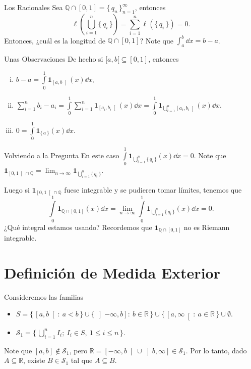 \documentclass[utf8]{beamer}
\theoremstyle{plain}
\theoremstyle{definition}
\theoremstyle{remark}
\numberwithin{equation}{section}
\newcommand{\bQ}{\mathbb{Q}}    %
\newcommand{\bR}{\mathbb{R}}    %
\newcommand{\cS}{\mathcal{S}}           %
\newcommand{\bonj}[1]{\left\lbrack#1\right\rbrack}
\newcommand{\rbonj}[1]{\left\rbrack#1\right\rbrack}
\newcommand{\lbonj}[1]{\left\lbrack#1\right\lbrack}
\newcommand{\set}[1]{\{\,#1\,\}}    %
\newcommand{\Set}[1]{\biggl\{\,#1\,\biggr\}} %
\renewcommand{\l}{\ell}                   %
\renewcommand{\leq}{\leqslant}          %
\newcommand{\ind}{\mathbf{1}}       %
\newcommand{\sucn}{_{n=1}^\infty} %
\renewcommand{\.}{\Cdot}                %
\begin{document}
\begin{frame}{Los Racionales}
  Sea $\bQ\cap[0,1]=\set{q_n}\sucn$, entonces
  $$\l\left(\bigcup_{i=1}^n\set{q_i}\right)=\sum_{i=1}^n\l(\set{q_i})=0.$$
  Entonces, ¿cuál es la longitud de $\bQ\cap[0,1]$? Note que $\displaystyle\int_a^b\dd x=b-a$. 
\end{frame}

\begin{frame}{Unas Observaciones}
  De hecho si $[a,b[\subseteq[0,1]$, entonces
  \begin{enumerate}[(i)]
    \item $\displaystyle b-a=\int\limits_0^1\ind_{\lbonj{a,b}}(x)\dd x$.
    \item $\displaystyle \sum_{i=1}^nb_i-a_i=\int\limits_0^1\sum_{i=1}^n\ind_{\lbonj{a_i,b_i}}(x)\dd x=\int\limits_0^1\ind_{\bigcup_{i=1}^n\lbonj{a_i,b_i}}(x)\dd x$.
    \item $\displaystyle 0=\int\limits_0^1\ind_{\set{a}}(x)\dd x$.
  \end{enumerate}
\end{frame}

\begin{frame}{Volviendo a la Pregunta}
  En este caso $\displaystyle\int\limits_0^1\ind_{\bigcup_{i=1}^n\set{q_i}}(x)\dd x=0$. Note que $\ind_{\lbonj{0,1}\cap\bQ}=\lim_{n\to\infty}\ind_{\bigcup_{i=1}^n\set{q_i}}$.\par 
  Luego si $\ind_{\lbonj{0,1}\cap\bQ}$ fuese integrable y se pudieren tomar límites, tenemos que 
  $$\int\limits_0^1\ind_{\bQ\cap\bonj{0,1}}(x)\dd x=\lim_{n\to\infty}\int\limits_0^1\ind_{\bigcup_{i=1}^n\set{q_i}}(x)\dd x=0.$$
  ¿Qué integral estamos usando? Recordemos que $\ind_{\bQ\cap\bonj{0,1}}$ no es Riemann integrable.
\end{frame}

\section{Definición de Medida Exterior}

\begin{frame}
  Consideremos las familias
  \begin{itemize}
    \item $\displaystyle S=\set{\lbonj{a,b}:\ a<b}\cup\set{\rbonj{-\infty,b}:\ b\in\bR}\cup\set{\lbonj{a,\infty}:\ a\in\bR}\cup \emptyset$.
    \item $\displaystyle\cS_1=\Set{\bigcup_{i=1}^n I_i;\ I_i\in S,\ 1\leq i\leq n}$.
  \end{itemize}
Note que $[a,b]\not\in\cS_1$, pero $\bR=\lbonj{-\infty,b}\cup\rbonj{b,\infty}\in\cS_1$. Por lo tanto, dado $A\subseteq\bR$, existe $B\in\cS_1$ tal que $A\subseteq B$.
\end{frame}
\end{document}
